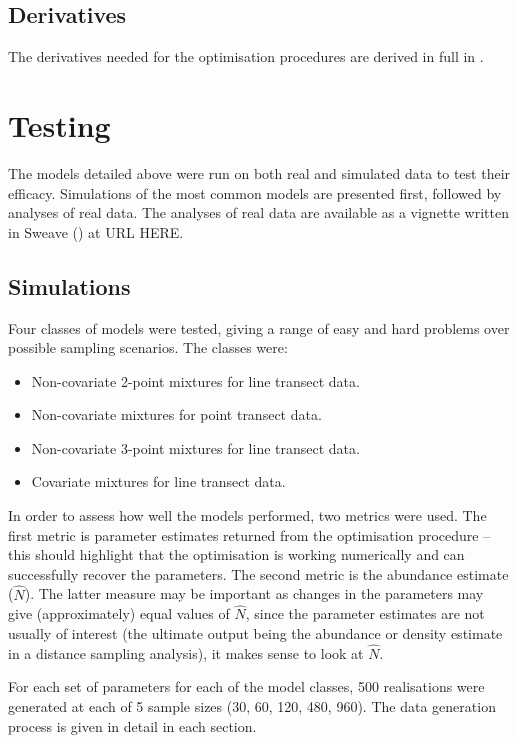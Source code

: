 \subsection{Derivatives}

The derivatives needed for the optimisation procedures are derived in full in .

\section{Testing}

The models detailed above were run on both real and simulated data to test their efficacy. Simulations of the most common models are presented first, followed by analyses of real data. The analyses of real data are available as a vignette written in Sweave (\cite{sweave}) at URL HERE.

\subsection{Simulations}

Four classes of models were tested, giving a range of easy and hard problems over possible sampling scenarios. The classes were:
\begin{itemize}
	\item Non-covariate 2-point mixtures for line transect data.
	\item Non-covariate mixtures for point transect data.
	\item Non-covariate 3-point mixtures for line transect data.
	\item Covariate mixtures for line transect data.
\end{itemize}
In order to assess how well the models performed, two metrics were used. The first metric is parameter estimates returned from the optimisation procedure -- this should highlight that the optimisation is working numerically and can successfully recover the parameters. The second metric is the abundance estimate ($\hat{N}$). The latter measure may be important as changes in the parameters may give (approximately) equal values of $\hat{N}$, since the parameter estimates are not usually of interest (the ultimate output being the abundance or density estimate in a distance sampling analysis), it makes sense to look at $\hat{N}$.

For each set of parameters for each of the model classes, 500 realisations were generated at each of 5 sample sizes (30, 60, 120, 480, 960). The data generation process is given in detail in each section.

